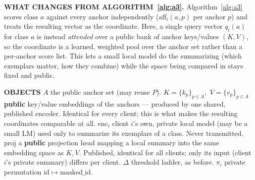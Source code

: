 \documentclass[11pt]{article}
\newcommand{\aff}{\mathrm{aff}}
\begin{document}
\begin{algorithm}[p]
\caption{Attention-projected coordinates (alternate Phase 1 for
         Algorithm~\ref{alg:a3}: replaces the raw affinity scan with a
         learned projection onto a public anchor set)}
\label{alg:a3b}
\footnotesize
{}
\begin{algorithmic}[1]

\Statex \hrulefill
\Statex \textbf{WHAT CHANGES FROM ALGORITHM~\ref{alg:a3}.} Algorithm~\ref{alg:a3}
        scores class $a$ against every anchor independently
        ($\aff_i(a,p)$ per anchor $p$) and treats the resulting vector as the
        coordinate. Here, a single query vector $q_i(a)$ for class $a$ is
        instead \emph{attended} over a public bank of anchor keys/values
        $(K,V)$, so the coordinate is a learned, weighted pool over the anchor
        set rather than a per-anchor score list. This lets a small local
        model do the summarizing (which exemplars matter, how they combine)
        while the space being compared in stays fixed and public.

\Statex \textbf{OBJECTS}
\Statex \quad $A$ \quad the public anchor set (may reuse $P$).
\Statex \quad $K = \{k_p\}_{p\in A}$,\ $V=\{v_p\}_{p\in A}$ \quad
        \textbf{public} key/value embeddings of the anchors --- produced by
        one shared, published encoder. Identical for every client; this is
        what makes the resulting coordinates comparable at all.
\Statex \quad $\mathrm{enc}_i$ \quad client $i$'s own, private local model
        (may be a small LM) used only to summarize its exemplars of a class.
        Never transmitted.
\Statex \quad $\mathrm{proj}$ \quad a \textbf{public} projection head mapping
        a local summary into the same embedding space as $K,V$. Published,
        identical for all clients; only its input (client $i$'s private
        summary) differs per client.
\Statex \quad $\Delta$ \quad threshold ladder, as before.
\Statex \quad $\pi_i$ \quad private permutation
        $\mathrm{id} \mapsto \mathrm{masked\_id}$.


\end{algorithmic}
\end{algorithm}
\end{document}
